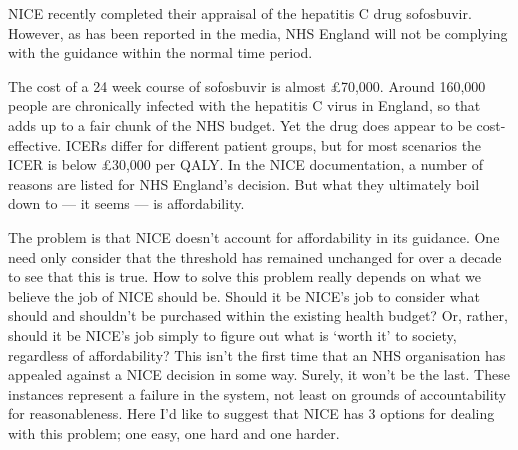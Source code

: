 NICE recently completed their appraisal of the hepatitis C drug sofosbuvir\cite{National_Institute_for_Health_and_Care_Excellence2015-cp}. However, as has been reported in the media, NHS England will not be complying with the guidance within the normal time period\cite{Boseley2015-zg}.

The cost of a 24 week course of sofosbuvir is almost £70,000. Around 160,000 people are chronically infected with the hepatitis C virus in England\cite{Public_Health_England2014-in}, so that adds up to a fair chunk of the NHS budget. Yet the drug does appear to be cost-effective. ICERs differ for different patient groups, but for most scenarios the ICER is below £30,000 per QALY. In the NICE documentation, a number of reasons are listed for NHS England's decision. But what they ultimately boil down to --- it seems --- is affordability.

The problem is that NICE doesn't account for affordability in its guidance. One need only consider that the threshold has remained unchanged for over a decade to see that this is true. How to solve this problem really depends on what we believe the job of NICE should be. Should it be NICE's job to consider what should and shouldn't be purchased within the existing health budget? Or, rather, should it be NICE's job simply to figure out what is `worth it' to society, regardless of affordability? This isn't the first time that an NHS organisation has appealed against a NICE decision in some way\cite{Wells_2007}. Surely, it won't be the last. These instances represent a failure in the system, not least on grounds of accountability for reasonableness\cite{Daniels_2000}. Here I'd like to suggest that NICE has 3 options for dealing with this problem; one easy, one hard and one harder.